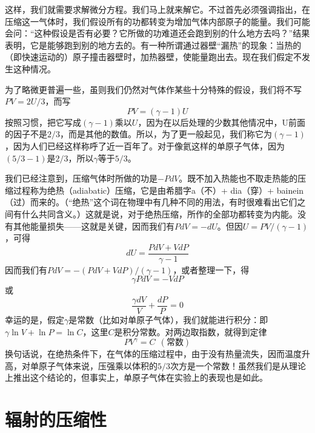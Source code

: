 这样，我们就需要求解微分方程。我们马上就来解它。不过首先必须强调指出，在压缩这一气体时，我们假设所有的功都转变为增加气体内部原子的能量。我们可能会问：“这种假设是否有必要？它所做的功难道还会跑到别的什么地方去吗？”结果表明，它是能够跑到别的地方去的。有一种所谓通过器壁“漏热”的现象：当热的（即快速运动的）原子撞击器壁时，加热器壁，使能量跑出去。现在我们假定不发生这种情况。

为了略微更普遍一些，虽则我们仍然对气体作某些十分特殊的假设，我们将不写$PV=2U/3$，而写
\begin{equation}
    \label{Eq:I:39:11}
    PV = (\gamma - 1)U
\end{equation}
按照习惯，把它写成$(\gamma-1)$乘以$U$，因为在以后处理的少数其他情况中，U前面的因子不是$2/3$，而是其他的数值。所以，为了更一般起见，我们称它为$(\gamma-1)$，因为人们已经这样称呼了近一百年了。对于像氦这样的单原子气体，因为$(5/3-1)$是$2/3$，所以$\gamma$等于$5/3$。

我们已经注意到，压缩气体时所做的功是$-PdV$。既不加入热能也不取走热能的压缩过程称为绝热（adiabatic）压缩，它是由希腊字a（不）+ dia（穿）+ bainein（过）而来的。（“绝热”这个词在物理中有几种不同的用法，有时很难看出它们之间有什么共同含义。）这就是说，对于绝热压缩，所作的全部功都转变为内能。没有其他能量损失——这就是关键，因而我们有$PdV=-dU$。但因$U=PV/(\gamma-1)$，可得
\begin{equation}
    \label{Eq:I:39:12}
    dU = \frac{PdV + VdP}{\gamma - 1}
\end{equation}
因而我们有$PdV=-(PdV+VdP)/(\gamma-1)$，或者整理一下，得
\begin{equation*}
    \gamma PdV = -VdP
\end{equation*}
或
\begin{equation}
    \label{Eq:I:39:13}
    \frac{\gamma dV}{V} + \frac{dP}{P} = 0
\end{equation}
幸运的是，假定$\gamma$是常数（比如对单原子气体），我们就能进行积分：即$\gamma\ln V+\ln P=\ln C$，这里$C$是积分常数。对两边取指数，就得到定律
\begin{equation}
    \label{Eq:I:39:14}
    PV^\gamma = C~~(\text{常数})
\end{equation}
换句话说，在绝热条件下，在气体的压缩过程中，由于没有热量流失，因而温度升高，对单原子气体来说，压强乘以体积的$5/3$次方是一个常数！虽然我们是从理论上推出这个结论的，但事实上，单原子气体在实验上的表现也是如此。

\section{辐射的压缩性}

